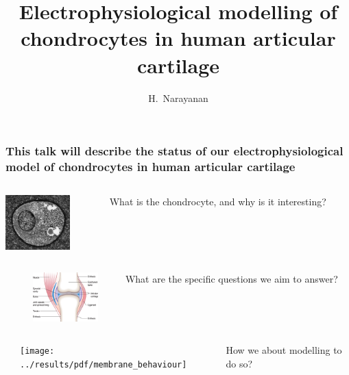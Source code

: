 \documentclass[ignorenonframetext]{beamer}
\title{Electrophysiological modelling of chondrocytes in human
  articular cartilage}
\author{H.~Narayanan}
\institute[]{}
\date[]{}
\begin{document}
%
%
%


\begin{frame}
  \frametitle{This talk will describe the status of our
    electrophysiological model of chondrocytes in human articular
    cartilage}
  \begin{columns}
    \begin{column}{3cm}
      \includegraphics[width=2.5cm]{../images/pdf/chondrocyte-micrograph}
    \end{column}
    \begin{column}{9cm}
      What is the chondrocyte, and why is it interesting?
    \end{column}
  \end{columns}
  \vspace{0.2cm}
  \begin{columns}
    \begin{column}{0.5cm}
    \end{column}
    \begin{column}{4.5cm}
      \includegraphics[width=2.5cm]{../images/pdf/joint}
    \end{column}
    \begin{column}{7cm}
      What are the specific questions we aim to answer?
    \end{column}
  \end{columns}
  \vspace{0.2cm}
  \begin{columns}
    \begin{column}{3.5cm}
    \end{column}
    \begin{column}{3cm}
      \texttt{[image: ../results/pdf/membrane\_behaviour]}
    \end{column}
    \begin{column}{0.5cm}
    \end{column}
    \begin{column}{5cm}
      How we about modelling to do so?

    \end{column}
  \end{columns}
\end{frame}
\end{document}

